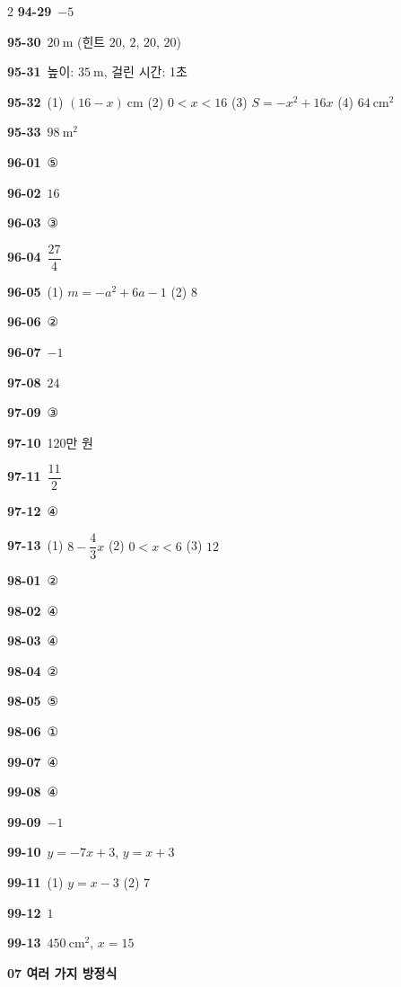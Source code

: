\documentclass[10pt,a4paper]{article}
\begin{document}
\begin{multicols}{2}
\noindent\textbf{94-29}\ $-5$\par
\noindent\textbf{95-30}\ $20\ \mathrm{m}$ (힌트 $20$, $2$, $20$, $20$)\par
\noindent\textbf{95-31}\ 높이: $35\ \mathrm{m}$, 걸린 시간: 1초\par
\noindent\textbf{95-32}\ (1) $(16-x)\ \mathrm{cm}$ (2) $0<x<16$ (3) $S=-x^2+16x$ (4) $64\ \mathrm{cm}^2$\par
\noindent\textbf{95-33}\ $98\ \mathrm{m}^2$\par
\noindent\textbf{96-01}\ ⑤\par
\noindent\textbf{96-02}\ $16$\par
\noindent\textbf{96-03}\ ③\par
\noindent\textbf{96-04}\ $\dfrac{27}{4}$\par
\noindent\textbf{96-05}\ (1) $m=-a^2+6a-1$ (2) $8$\par
\noindent\textbf{96-06}\ ②\par
\noindent\textbf{96-07}\ $-1$\par
\noindent\textbf{97-08}\ $24$\par
\noindent\textbf{97-09}\ ③\par
\noindent\textbf{97-10}\ 120만 원\par
\noindent\textbf{97-11}\ $\dfrac{11}{2}$\par
\noindent\textbf{97-12}\ ④\par
\noindent\textbf{97-13}\ (1) $8-\dfrac{4}{3}x$ (2) $0<x<6$ (3) $12$\par
\noindent\textbf{98-01}\ ②\par
\noindent\textbf{98-02}\ ④\par
\noindent\textbf{98-03}\ ④\par
\noindent\textbf{98-04}\ ②\par
\noindent\textbf{98-05}\ ⑤\par
\noindent\textbf{98-06}\ ①\par
\noindent\textbf{99-07}\ ④\par
\noindent\textbf{99-08}\ ④\par
\noindent\textbf{99-09}\ $-1$\par
\noindent\textbf{99-10}\ $y=-7x+3$, $y=x+3$\par
\noindent\textbf{99-11}\ (1) $y=x-3$ (2) $7$\par
\noindent\textbf{99-12}\ $1$\par
\noindent\textbf{99-13}\ $450\ \mathrm{cm}^2$, $x=15$\par
\noindent\textbf{07 여러 가지 방정식}\par\smallskip

\end{multicols}
\end{document}
